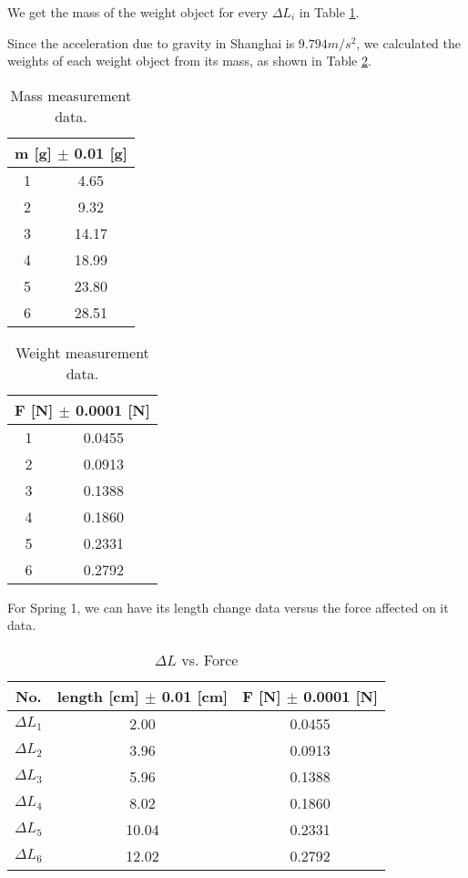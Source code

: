 We get the mass of the weight object for every $\Delta L_i$ in Table
\ref{massofweight}.

Since the acceleration due to gravity in Shanghai is $9.794 m/s^2$, we calculated
the weights of each weight object from its mass, as shown in Table
\ref{gravityofweight}. 

\begin{minipage}{0.5\linewidth}
\begin{table}[H]
\centering
\begin{tabular}{|c|c|}
\hline
\multicolumn{2}{|c|}{m [g] $\pm$ 0.01 [g]} \\ \hline
1 & 4.65  \\ \hline
2 & 9.32  \\ \hline
3 & 14.17 \\ \hline
4 & 18.99 \\ \hline
5 & 23.80 \\ \hline
6 & 28.51 \\ \hline
\end{tabular}
\caption{Mass measurement data.}
\label{massofweight}
\end{table}
\end{minipage}
%
\begin{minipage}{0.5\linewidth}
\begin{table}[H]
\centering
\begin{tabular}{|c|c|}
\hline
\multicolumn{2}{|c|}{F [N] $\pm$ 0.0001 [N]} \\ \hline
1  & 0.0455  \\ \hline 
2  & 0.0913  \\ \hline 
3  & 0.1388  \\ \hline 
4  & 0.1860  \\ \hline 
5  & 0.2331  \\ \hline 
6  & 0.2792  \\ \hline 
\end{tabular}
\caption{Weight measurement data.}
\label{gravityofweight}
\end{table}
\end{minipage}

For Spring 1, we can have its length change data versus the force affected on it
data. 

\begin{table}[H]
\centering
\begin{tabular}{|c|c|c|}
\hline
No. & length [cm] $\pm$ 0.01 [cm] & F [N] $\pm$ 0.0001 [N] \\ \hline
$\Delta L_1$ & 2.00  &  0.0455  \\ \hline
$\Delta L_2$ & 3.96  &  0.0913  \\ \hline
$\Delta L_3$ & 5.96  &  0.1388  \\ \hline
$\Delta L_4$ & 8.02  &  0.1860  \\ \hline
$\Delta L_5$ & 10.04 &  0.2331  \\ \hline
$\Delta L_6$ & 12.02 &  0.2792  \\ \hline
\end{tabular}
\caption{$\Delta L$  vs. Force}
\label{s1df}
\end{table}


